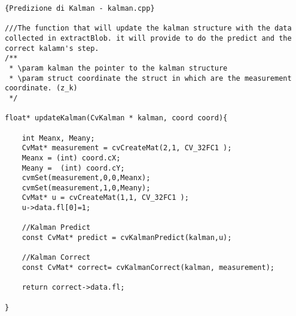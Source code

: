 \lstset{language=c++}
\lstset{commentstyle=\emph}
\begin{lstlisting}[frame=r,caption=Predizione di Kalman - kalman.cpp ,breaklines=true,basicstyle=\small]{Predizione di Kalman - kalman.cpp}

///The function that will update the kalman structure with the data collected in extractBlob. it will provide to do the predict and the correct kalamn's step.
/**
 * \param kalman the pointer to the kalman structure
 * \param struct coordinate the struct in which are the measurement coordinate. (z_k)
 */

float* updateKalman(CvKalman * kalman, coord coord){
	
	int Meanx, Meany;
	CvMat* measurement = cvCreateMat(2,1, CV_32FC1 );
	Meanx = (int) coord.cX;
	Meany =  (int) coord.cY;
	cvmSet(measurement,0,0,Meanx);
	cvmSet(measurement,1,0,Meany);
	CvMat* u = cvCreateMat(1,1, CV_32FC1 );
	u->data.fl[0]=1;
	
	//Kalman Predict
	const CvMat* predict = cvKalmanPredict(kalman,u);

	//Kalman Correct
	const CvMat* correct= cvKalmanCorrect(kalman, measurement);
	
	return correct->data.fl;

}


\end{lstlisting}





